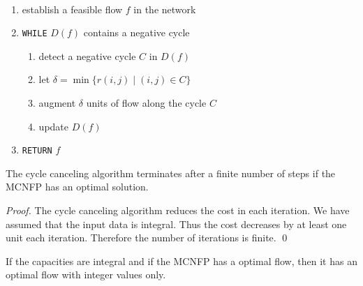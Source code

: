 \begin{algorithm}
  \label{alg:1}
  ~\\
  \begin{enumerate}
  \item  establish a feasible flow $f$ in the network
  \item {\tt WHILE} $D(f)$ contains a negative cycle
    \begin{enumerate}
    \item  detect a negative cycle $C$ in $D(f)$
    \item let $\delta=\min\{r{(i,j)} \mid (i,j) \in C\}$
    \item augment $\delta$ units of flow along the cycle $C$
    \item update $D(f)$
    \end{enumerate}
  \item {\tt RETURN}  $f$
  \end{enumerate}
\end{algorithm}




  \begin{theorem}
    \label{f:thr:12}
    The cycle canceling algorithm terminates after a finite number of
    steps if the MCNFP has an optimal solution. 
  \end{theorem}
  \begin{proof}   
  The cycle canceling algorithm reduces the cost in each iteration.
  We have assumed that the input data is integral. Thus the cost
  decreases by at least one unit each iteration. 
  Therefore the number of iterations is finite.    
  \qed
\end{proof}


\begin{corollary}
  \label{co:3}
  If the capacities are  integral and if the MCNFP has a optimal flow, then
  it has an optimal flow with integer values only. 
\end{corollary}




    

